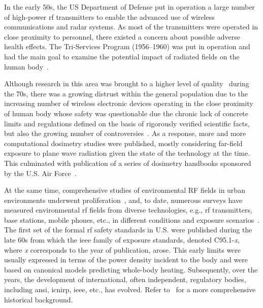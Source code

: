 In the early 50s, the US Department of Defense put in operation a large number of high-power \gls{rf} transmitters to enable the advanced use of wireless communications and radar systems.
As most of the transmitters were operated in close proximity to personnel, there existed a concern about possible adverse health effects.
The Tri-Services Program (1956–1960) was put in operation and had the main goal to examine the potential impact of radiated fields on the human body~\cite{Lin1994Early}.

Although research in this area was brought to a higher level of quality~\cite{Guy1971Analyses} during the 70s, there was a growing distrust within the general population due to the increasing number of wireless electronic devices operating in the close proximity of human body whose safety was questionable due the chronic lack of concrete limits and regulations defined on the basis of rigorously verified scientific facts, but also the growing number of controversies~\cite{Foster2022Three}.
As a response, more and more computational dosimetry studies were published, mostly considering far-field exposure to plane wave radiation given the state of the technology at the time.
This culminated with publication of a series of dosimetry handbooks sponsored by the U.S. Air Force~\cite{Durney1986Radiofrequency}.

At the same time, comprehensive studies of
environmental RF fields in urban environments underwent proliferation~\cite{Tell1976Measurement}, and, to date, numerous surveys have measured environmental \gls{rf} fields from diverse technologies, e.g., \gls{rf} transmitters, base stations, mobile phones, etc., in different conditions and exposure scenarios~\cite{Jalilian2019Public}.
The first set of the formal \gls{rf} safety standards in U.S. were published during the late 60s from which the \gls{ieee} family of exposure standards, denoted C95.1-\textit{x}, where \textit{x} corresponds to the year of publication, arose.
This early limits were usually expressed in terms of the power density incident to the body and were based on canonical models predicting whole-body heating.
Subsequently, over the years, the development of international, often independent, regulatory bodies, including \gls{ansi}, \gls{icnirp}, \gls{ieee}, etc., has evolved.
Refer to~\cite{Roach2009Radiofrequency} for a more comprehensive historical background.

